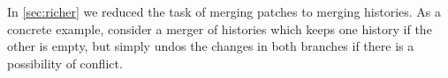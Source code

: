 In \autoref{sec:richer} we reduced the task of merging patches to merging histories.
As a concrete example, consider a merger of histories which keeps one history if the other is empty,
but simply undos the changes in both branches if there is a possibility of conflict.
\begin{code}%
%
\>[2]\AgdaSpace{}%
\AgdaSymbol{:}%
\>[655I]\AgdaSymbol{\{}\AgdaSpace{}%
\AgdaSpace{}%
\AgdaSymbol{:}\AgdaSpace{}%
\AgdaSymbol{\}}\AgdaSpace{}%
\<%
\\
\>[.][@{}l@{}]\<[655I]%
\>[15]\AgdaSymbol{(}\AgdaSpace{}%
\AgdaSymbol{:}\AgdaSpace{}%
\AgdaSpace{}%
\AgdaSpace{}%
\AgdaSymbol{)}\AgdaSpace{}%
\AgdaSymbol{(}\AgdaSpace{}%
\AgdaSymbol{:}\AgdaSpace{}%
\AgdaSpace{}%
\AgdaSpace{}%
\AgdaSymbol{)}\AgdaSpace{}%
\<%
\\
%
\>[15]\AgdaFunction{Σ[}\AgdaSpace{}%
\AgdaSpace{}%
\AgdaSpace{}%
\AgdaSpace{}%
\AgdaFunction{]}\AgdaSpace{}%
\AgdaSymbol{(}\AgdaFunction{Σ[}\AgdaSpace{}%
\AgdaSpace{}%
\AgdaSpace{}%
\AgdaSpace{}%
\AgdaSpace{}%
\AgdaSpace{}%
\AgdaFunction{]}\AgdaSpace{}%
\AgdaSymbol{(}\AgdaSpace{}%
\AgdaSpace{}%
\AgdaSpace{}%
\AgdaSpace{}%
\AgdaSpace{}%
\AgdaSpace{}%
\AgdaSymbol{))}\<%
\\
%
\>[2]\AgdaSpace{}%
\AgdaSymbol{\{\AgdaUnderscore{}\}}\AgdaSpace{}%
\AgdaSymbol{\{}\AgdaSymbol{\}}\AgdaSpace{}%
\AgdaInductiveConstructor{[]}\AgdaSpace{}%
\AgdaSpace{}%
\AgdaSymbol{=}\AgdaSpace{}%
\AgdaSpace{}%
\AgdaOperator{\AgdaInductiveConstructor{,}}\AgdaSpace{}%
\AgdaSpace{}%
\AgdaOperator{\AgdaInductiveConstructor{,}}\AgdaSpace{}%
\AgdaSymbol{(}\AgdaSpace{}%
\AgdaOperator{\AgdaInductiveConstructor{,}}\AgdaSpace{}%
\AgdaSpace{}%
\AgdaSymbol{)}\AgdaSpace{}%
\AgdaOperator{\AgdaInductiveConstructor{,}}\AgdaSpace{}%
\AgdaSymbol{(}\AgdaInductiveConstructor{[]}\AgdaSpace{}%
\AgdaOperator{\AgdaInductiveConstructor{,}}\AgdaSpace{}%
\AgdaSymbol{)}\<%
\\
%
\>[2]\AgdaSpace{}%

\end{code}
